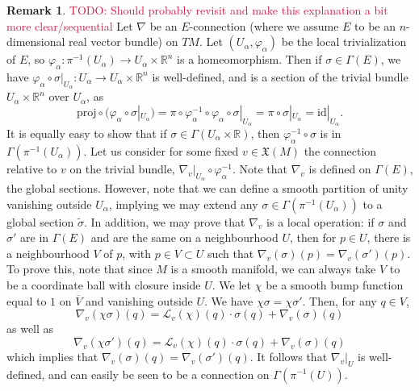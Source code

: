 \documentclass[aps,pra,showpacs,notitlepage,onecolumn,superscriptaddress,nofootinbib]{revtex4-1}
\newcommand{\pop}[1]{\textcolor{crimson}{#1}}
\theoremstyle{definition}
\newtheorem{remark}{Remark}[section]
\begin{document}
\begin{remark}
    \pop{TODO: Should probably revisit and make this explanation a bit more clear/sequential}
    Let $\nabla$ be an $E$-connection (where we assume $E$ to be an $n$-dimensional real vector bundle) on $TM$. Let $(U_{\alpha}, \varphi_{\alpha})$ be the local trivialization of $E$, so $\varphi_{\alpha} : \pi^{-1}(U_{\alpha}) \rightarrow U_{\alpha} \times \mathbb{R}^{n}$ 
    is a homeomorphism. Then if $\sigma \in \Gamma(E)$, we have $\varphi_{\alpha} \circ \sigma|_{U_{\alpha}} : U_{\alpha} \rightarrow U_{\alpha} \times \mathbb{R}^{n}$ is well-defined, and is a section of the trivial bundle $U_{\alpha} \times \mathbb{R}^{n}$ over $U_{\alpha}$, as
    \begin{equation}
        \text{proj} \circ (\varphi_{\alpha} \circ \sigma|_{U_{\alpha}}) = \pi \circ \varphi^{-1}_{\alpha} \circ \varphi_{\alpha} \circ \sigma|_{U_{\alpha}} = \pi \circ \sigma|_{U_{\alpha}} = \text{id}|_{U_{\alpha}}.
    \end{equation}
    It is equally easy to show that if $\sigma \in \Gamma(U_{\alpha} \times \mathbb{R})$, then $\varphi_{\alpha}^{-1} \circ \sigma$ is in $\Gamma(\pi^{-1}(U_{\alpha}))$. 
    Let us consider for some fixed $v \in \mathfrak{X}(M)$ the connection relative to $v$ on the trivial bundle, $\nabla_{v}|_{U_{\alpha}} \circ \varphi_{\alpha}^{-1}$. Note that $\nabla_v$ is defined 
    on $\Gamma(E)$, the global sections. However, note that we can define a smooth partition of unity vanishing outside $U_{\alpha}$, implying we may extend any $\sigma \in \Gamma(\pi^{-1}(U_{\alpha}))$ 
    to a global section $\widetilde{\sigma}$. In addition, we may prove that $\nabla_v$ is a local operation: if $\sigma$ and $\sigma'$ are in $\Gamma(E)$ and are the same on a neighbourhood $U$, then for $p \in U$, there 
    is a neighbourhood $V$ of $p$, with $p \in V \subset U$ such that $\nabla_v(\sigma)(p) = \nabla_v(\sigma')(p)$. To prove this, note that since $M$ is a smooth manifold, we can always take $V$ to be a coordinate ball 
    with closure inside $U$. We let $\chi$ be a smooth bump function equal to $1$ on $\overline{V}$ and vanishing outside $U$. We have $\chi \sigma = \chi \sigma'$. Then, for any $q \in V$,
    \begin{equation}
        \nabla_{v}(\chi \sigma)(q) = \mathcal{L}_v(\chi)(q) \cdot \sigma(q) + \nabla_v(\sigma)(q)
    \end{equation}
    as well as
    \begin{equation}
        \nabla_{v}(\chi \sigma')(q) = \mathcal{L}_v(\chi)(q) \cdot \sigma(q) + \nabla_v(\sigma)(q)
    \end{equation}
    which implies that $\nabla_v(\sigma)(q) = \nabla_v(\sigma')(q)$. It follows that $\nabla_v|_U$ is well-defined, and can easily be seen to be a connection on $\Gamma(\pi^{-1}(U))$.


\end{remark}
\end{document}

